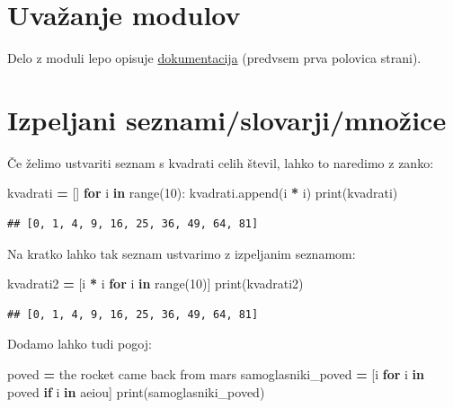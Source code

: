 \documentclass[
]{report}
\newenvironment{Shaded}{\begin{snugshade}}{\end{snugshade}}
\newcommand{\BuiltInTok}[1]{#1}
\newcommand{\ControlFlowTok}[1]{\textcolor[rgb]{0.13,0.29,0.53}{\textbf{#1}}}
\newcommand{\DecValTok}[1]{\textcolor[rgb]{0.00,0.00,0.81}{#1}}
\newcommand{\KeywordTok}[1]{\textcolor[rgb]{0.13,0.29,0.53}{\textbf{#1}}}
\newcommand{\NormalTok}[1]{#1}
\newcommand{\OperatorTok}[1]{\textcolor[rgb]{0.81,0.36,0.00}{\textbf{#1}}}
\newcommand{\StringTok}[1]{\textcolor[rgb]{0.31,0.60,0.02}{#1}}
\begin{document}
\hypertarget{uvaux17eanje-modulov}{%
\section{Uvažanje modulov}\label{uvaux17eanje-modulov}}

Delo z moduli lepo opisuje \href{https://docs.python.org/3/tutorial/modules.html}{dokumentacija} (predvsem prva polovica strani).

\hypertarget{izpeljani-seznamislovarjimnoux17eice}{%
\section{Izpeljani seznami/slovarji/množice}\label{izpeljani-seznamislovarjimnoux17eice}}

Če želimo ustvariti seznam s kvadrati celih števil, lahko to naredimo z zanko:

\begin{Shaded}
\begin{Highlighting}[]
\NormalTok{kvadrati }\OperatorTok{=}\NormalTok{ []}
\ControlFlowTok{for}\NormalTok{ i }\KeywordTok{in} \BuiltInTok{range}\NormalTok{(}\DecValTok{10}\NormalTok{):}
\NormalTok{    kvadrati.append(i }\OperatorTok{*}\NormalTok{ i)}
\BuiltInTok{print}\NormalTok{(kvadrati)}
\end{Highlighting}
\end{Shaded}

\begin{verbatim}
## [0, 1, 4, 9, 16, 25, 36, 49, 64, 81]
\end{verbatim}

Na kratko lahko tak seznam ustvarimo z izpeljanim seznamom:

\begin{Shaded}
\begin{Highlighting}[]
\NormalTok{kvadrati2 }\OperatorTok{=}\NormalTok{ [i }\OperatorTok{*}\NormalTok{ i }\ControlFlowTok{for}\NormalTok{ i }\KeywordTok{in} \BuiltInTok{range}\NormalTok{(}\DecValTok{10}\NormalTok{)]}
\BuiltInTok{print}\NormalTok{(kvadrati2)}
\end{Highlighting}
\end{Shaded}

\begin{verbatim}
## [0, 1, 4, 9, 16, 25, 36, 49, 64, 81]
\end{verbatim}

Dodamo lahko tudi pogoj:

\begin{Shaded}
\begin{Highlighting}[]
\NormalTok{poved }\OperatorTok{=} \StringTok{\textquotesingle{}the rocket came back from mars\textquotesingle{}}
\NormalTok{samoglasniki\_poved }\OperatorTok{=}\NormalTok{ [i }\ControlFlowTok{for}\NormalTok{ i }\KeywordTok{in}\NormalTok{ poved }\ControlFlowTok{if}\NormalTok{ i }\KeywordTok{in} \StringTok{\textquotesingle{}aeiou\textquotesingle{}}\NormalTok{]}
\BuiltInTok{print}\NormalTok{(samoglasniki\_poved)}
\end{Highlighting}
\end{Shaded}
\end{document}
